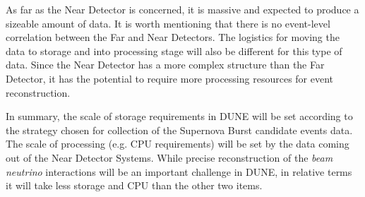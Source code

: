 As far as the Near Detector is concerned, it is massive and expected to produce a sizeable amount of data. It is worth mentioning
that there is no event-level correlation between the Far and Near Detectors. The logistics for moving the data to storage and into processing stage
will also be different for this type of data. Since the Near Detector has a more complex structure than the Far Detector, it has
the potential to require more processing resources for event reconstruction.

In summary, the scale of storage requirements in DUNE will be set according to the strategy chosen for
collection of the Supernova Burst candidate events data. The scale of processing (e.g. CPU requirements)
will be set by the data coming out of the Near Detector Systems. While precise reconstruction of the
\textit{beam neutrino} interactions will be an important challenge in DUNE, in relative terms it will take less storage
and CPU than the other two items.


